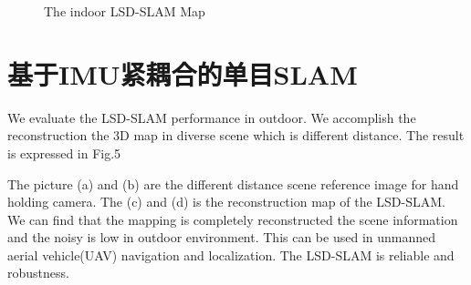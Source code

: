 \begin{figure}
          \hspace{0in}
     \caption{The indoor LSD-SLAM Map}
\end{figure}

\section{基于IMU紧耦合的单目SLAM}
We evaluate the LSD-SLAM performance in outdoor. We accomplish the reconstruction the 3D map in diverse scene which is different distance. The result is expressed in Fig.5

The picture (a) and (b) are the different distance scene reference image for hand holding camera. The (c) and (d) is the reconstruction map of the LSD-SLAM. We can find that the mapping is completely reconstructed the scene information and the noisy is low in outdoor environment. This can be used in unmanned aerial vehicle(UAV) navigation and localization. The LSD-SLAM is reliable and robustness.

